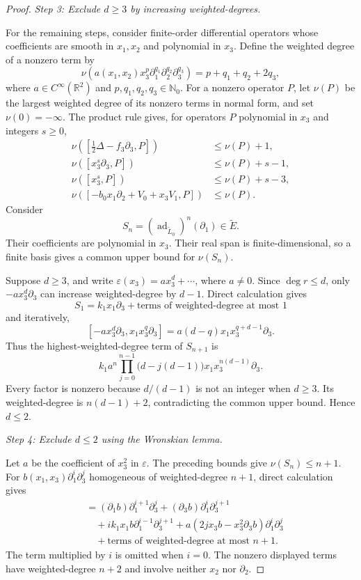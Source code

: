 \documentclass{tCON2e}
\newenvironment{revision}{\begingroup\color{black}}{\endgroup}
\numberwithin{equation}{section}
\theoremstyle{journalplain}
\theoremstyle{journaldef}
\newenvironment{revision}{}{}
\begin{document}
\begin{revision}
\begin{proof}
\medskip
\noindent\emph{Step 3: Exclude $d\ge3$ by increasing weighted-degrees.}

For the remaining steps, consider finite-order differential
operators whose coefficients are smooth in $x_1,x_2$ and
polynomial in $x_3$. Define the weighted degree of a nonzero
term by
\[
\nu\!\left(
a(x_1,x_2)x_3^p
\partial_1^{q_1}\partial_2^{q_2}\partial_3^{q_3}
\right)
=p+q_1+q_2+2q_3,
\]
where $a\in C^\infty(\mathbb R^2)$ and
$p,q_1,q_2,q_3\in\mathbb N_0$.
For a nonzero operator $P$, let $\nu(P)$ be the largest
weighted degree of its nonzero terms in normal form,
and set $\nu(0)=-\infty$.
The product rule gives, for operators $P$ polynomial in
$x_3$ and integers $s\ge0$,
\begin{align*}
\nu([\tfrac12\Delta-f_3\partial_3,P])
&\le\nu(P)+1,\\
\nu([x_3^s\partial_3,P])
&\le\nu(P)+s-1,\\
\nu([x_3^s,P])
&\le\nu(P)+s-3,\\
\nu([-b_0x_1\partial_2+V_0+x_3V_1,P])
&\le\nu(P).
\end{align*}
Consider
\[
S_n=(\operatorname{ad}_{\widetilde L_0})^n(\partial_1)
\in\widetilde E.
\]
Their coefficients are polynomial in $x_3$. Their real span
is finite-dimensional, so a finite basis gives a common
upper bound for $\nu(S_n)$.

Suppose $d\ge3$, and write
$\varepsilon(x_3)=a x_3^d+\cdots$, where $a\ne0$.
Since $\deg r\le d$, only $-a x_3^d\partial_3$ can increase
weighted-degree by $d-1$. Direct calculation gives
\[
S_1=k_1x_1\partial_3+\text{terms of weighted-degree at most }1
\]
and iteratively,
\[
[-a x_3^d\partial_3,x_1x_3^q\partial_3]
=a(d-q)x_1x_3^{q+d-1}\partial_3.
\]
Thus the highest-weighted-degree term of $S_{n+1}$ is
\[
k_1a^n\prod_{j=0}^{n-1}\bigl(d-j(d-1)\bigr)
x_1x_3^{n(d-1)}\partial_3.
\]
Every factor is nonzero because $d/(d-1)$ is not an integer
when $d\ge3$. Its weighted-degree is $n(d-1)+2$, contradicting
the common upper bound. Hence $d\le2$.

\medskip
\noindent\emph{Step 4: Exclude $d\le2$ using the Wronskian lemma.}

Let $a$ be the coefficient of $x_3^2$ in $\varepsilon$.
The preceding bounds give $\nu(S_n)\le n+1$.
For $b(x_1,x_3)\partial_1^i\partial_3^j$ homogeneous of
weighted-degree $n+1$, direct calculation gives
\begin{align*}
[\widetilde L_0,b\partial_1^i\partial_3^j]
&=(\partial_1b)\partial_1^{i+1}\partial_3^j
+(\partial_3b)\partial_1^i\partial_3^{j+1}\\
&\quad
+i k_1x_1b\partial_1^{i-1}\partial_3^{j+1}
+a(2jx_3b-x_3^2\partial_3b)\partial_1^i\partial_3^j\\
&\quad+\text{terms of weighted-degree at most }n+1.
\end{align*}
The term multiplied by $i$ is omitted when $i=0$.
The nonzero displayed terms have weighted-degree $n+2$ and involve
neither $x_2$ nor $\partial_2$.


\end{proof}
\end{revision}
\end{document}
